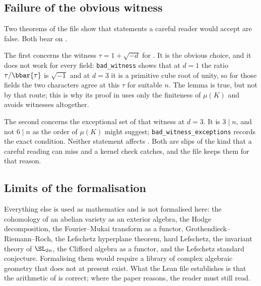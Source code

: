 \subsection{Failure of the obvious witness}

Two theorems of the file show that statements a careful reader would accept
are false. Both bear on .

The first concerns the witness $\tau=1+\sqrt{-d}$ for .
It is the obvious choice, and it does not work for every field:
\texttt{bad\_witness} shows that at $d=1$ the ratio $\tau/\bbar{\tau}$ is
$\sqrt{-1}$ and at $d=3$ it is a primitive cube root of unity, so for those
fields the two characters agree at this $\tau$ for suitable $n$. The lemma is
true, but not by that route; this is why its proof in 
uses only the finiteness of $\mu(K)$ and avoids witnesses altogether.

The second concerns the exceptional set of that witness at $d=3$. It is
$3\mid n$, and not $6\mid n$ as the order of $\mu(K)$ might suggest;
\texttt{bad\_witness\_exceptions} records the exact condition. Neither
statement affects . Both are slips of the kind that a
careful reading can miss and a kernel check catches, and the file keeps them
for that reason.

\subsection{Limits of the formalisation}

Everything else is used as mathematics and is not formalised here: the
cohomology of an abelian variety as an exterior algebra, the Hodge
decomposition, the Fourier--Mukai transform as a functor,
Grothendieck--Riemann--Roch, the Lefschetz hyperplane theorem, hard Lefschetz,
the invariant theory of $\SL_{2n}$, the Clifford algebra as a functor, and the
Lefschetz standard conjecture. Formalising them would require a library of
complex algebraic geometry that does not at present exist. What the Lean file
establishes is that the arithmetic of  is correct; where the
paper reasons, the reader must still read.
